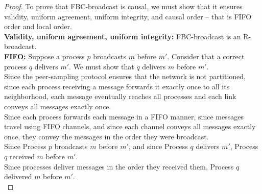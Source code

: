 \begin{proof}
  To prove that FBC-broadcast is causal, we must show that it ensures validity,
  uniform agreement, uniform integrity, and causal order -- that is FIFO order
  and local order. \\
  \textbf{Validity, uniform agreement, uniform integrity:} FBC-broadcast is an
  R-broadcast. \\
  \textbf{FIFO:} Suppose a process $p$ broadcasts $m$ before $m'$. Consider that
  a correct process $q$ delivers $m'$. We must show that $q$ delivers $m$ before
  $m'$. \\
  Since the peer-sampling protocol ensures that the network is not partitioned,
  since each process receiving a message forwards it exactly once to all its
  neighborhood, each message eventually reaches all processes and each link
  conveys all messages exactly once. \\
  Since each process forwards each message in a FIFO manner, since messages
  travel using FIFO channels, and since each channel conveys all messages
  exactly once, they convey the messages in the order they were broadcast. \\
  Since Process $p$ broadcasts $m$ before $m'$, and since Process $q$ delivers
  $m'$, Process $q$ received $m$ before $m'$. \\
  Since processes deliver messages in the order they received them, Process $q$
  delivered $m$ before $m'$. \\

\end{proof}
